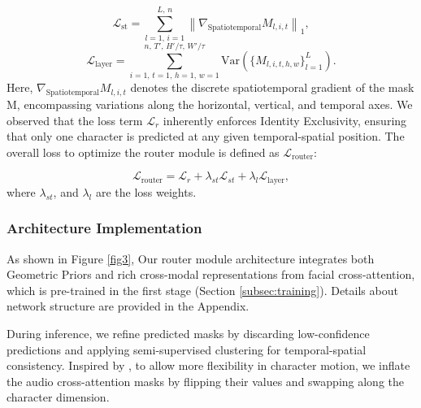 \begin{equation}
\mathcal{L}_{\text{st}} = \sum_{l=1, \, i=1}^{L, \, n} \left\| \nabla_{\text{Spatiotemporal}} M_{l,i, t} \right\|_1,
\end{equation}
\begin{equation}
\mathcal{L}_{\text{layer}} = \sum_{i=1, \, t=1,\, h=1, \, w=1}^{n, \, T',\, H'/\tau,\,W'/\tau} \text{Var}\left( \{ M_{l,i,t,h,w} \}_{l=1}^{L} \right).
\end{equation}
Here, \(\nabla_{\text{Spatiotemporal}} M_{l,i, t}\) denotes the discrete spatiotemporal gradient of the mask M, encompassing variations along the horizontal, vertical, and temporal axes.
We observed that the loss term \(\mathcal{L}_r\) inherently enforces Identity Exclusivity, ensuring that only one character is predicted at any given temporal-spatial position.
The overall loss to optimize the router module is defined as \( \mathcal{L}_{\text{router}} \):

\begin{equation}
\mathcal{L}_{\text{router}} = \mathcal{L}_r + \lambda_{st} \mathcal{L}_{st} + \lambda_l \mathcal{L}_{\text{layer}},
\end{equation}
where \( \lambda_{st} \), and \( \lambda_l \) are the loss weights.

\subsubsection{Architecture Implementation}
As shown in Figure \ref{fig3}, Our router module architecture integrates both Geometric Priors and rich cross-modal representations from facial cross-attention, which is pre-trained in the first stage (Section \ref{subsec:training}). Details about network structure are provided in the Appendix.

During inference, we refine predicted masks by discarding low-confidence predictions and applying semi-supervised clustering for temporal-spatial consistency. Inspired by \cite{leonardis_emo_2025}, to allow more flexibility in character motion, we inflate the audio cross-attention masks by flipping their values and swapping along the character dimension.

